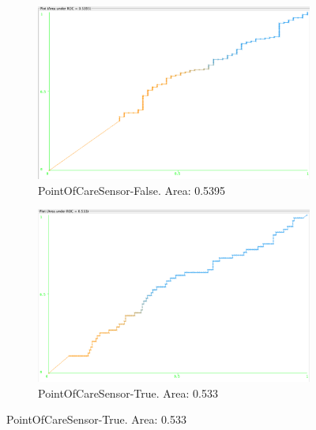 \documentclass[11pt, notitlepage,abstracton,oneside]{article}   	%
\begin{document}
\begin{figure}[H]
    \begin{subfigure}[b]{0.45\textwidth}
        \centering
        \includegraphics[width=\textwidth]{figures/approach2/PointOfCareSensor-False(0)}
        \caption{PointOfCareSensor-False. Area: 0.5395}
        \label{fig:PointOfCareSensor-False(0)}
    \end{subfigure}
    \hfill
    \begin{subfigure}[b]{0.45\textwidth}
        \centering
        \includegraphics[width=\textwidth]{figures/approach2/PointOfCareSensor-True(1)}
        \caption{PointOfCareSensor-True. Area: 0.533}
        \label{fig:PointOfCareSensor-True(1)}
    \end{subfigure}
    \hfill


\end{figure}
\end{document}
